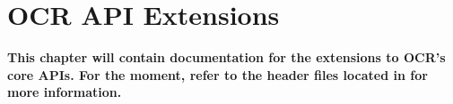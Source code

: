 \chapter{OCR API Extensions}
\label{chap:OCR API Extensions}
\label{chap:Appendix B}

{\bf This chapter will contain documentation for the extensions to
  OCR's core APIs. For the moment, refer to the header files located
  in  for more information.}